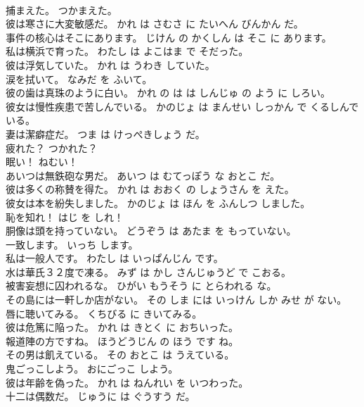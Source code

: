 \documentclass[8pt]{extreport}
\begin{document}
\begin{CJK}{UTF8}{min}
\\	捕まえた。	つかまえた。	
\\	彼は寒さに大変敏感だ。	かれ は さむさ に たいへん びんかん だ。	
\\	事件の核心はそこにあります。	じけん の かくしん は そこ に あります。	
\\	私は横浜で育った。	わたし は よこはま で そだった。	
\\	彼は浮気していた。	かれ は うわき していた。	
\\	涙を拭いて。	なみだ を ふいて。	
\\	彼の歯は真珠のように白い。	かれ の は は しんじゅ の よう に しろい。	
\\	彼女は慢性疾患で苦しんでいる。	かのじょ は まんせい しっかん で くるしんでいる。	
\\	妻は潔癖症だ。	つま は けっぺきしょう だ。	
\\	疲れた？	つかれた？	
\\	眠い！	ねむい！	
\\	あいつは無鉄砲な男だ。	あいつ は むてっぽう な おとこ だ。	
\\	彼は多くの称賛を得た。	かれ は おおく の しょうさん を えた。	
\\	彼女は本を紛失しました。	かのじょ は ほん を ふんしつ しました。	
\\	恥を知れ！	はじ を しれ！	
\\	胴像は頭を持っていない。	どうぞう は あたま を もっていない。	
\\	一致します。	いっち します。	
\\	私は一般人です。	わたし は いっぱんじん です。	
\\	水は華氏３２度で凍る。	みず は かし さんじゅうど で こおる。	
\\	被害妄想に囚われるな。	ひがい もうそう に とらわれる な。	
\\	その島には一軒しか店がない。	その しま には いっけん しか みせ が ない。	
\\	唇に聴いてみる。	くちびる に きいてみる。	
\\	彼は危篤に陥った。	かれ は きとく に おちいった。	
\\	報道陣の方ですね。	ほうどうじん の ほう です ね。	
\\	その男は飢えている。	その おとこ は うえている。	
\\	鬼ごっこしよう。	おにごっこ しよう。	
\\	彼は年齢を偽った。	かれ は ねんれい を いつわった。	
\\	十二は偶数だ。	じゅうに は ぐうすう だ。	

\end{CJK}
\end{document}
